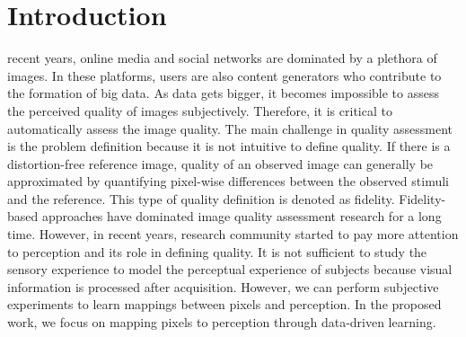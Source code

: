 \documentclass[draftcls,12pt, onecolumn]{IEEEtran}
\begin{document}
\IEEEpeerreviewmaketitle



\section{Introduction}
\label{sec:intro}
 recent years, online media and social networks are dominated by a plethora of images. In these platforms, users are also content generators who contribute to the formation of big data. As data gets bigger, it becomes impossible to assess the perceived quality of images subjectively. Therefore, it is critical to automatically assess the image quality. The main challenge in quality assessment is the problem definition because it is not intuitive to define quality. If there is a distortion-free reference image, quality of an observed image can generally be approximated by quantifying pixel-wise differences between the observed stimuli and the reference. This type of quality definition is denoted as fidelity. Fidelity-based approaches have dominated image quality assessment research for a long time. However, in recent years, research community started to pay more attention to perception and its role in defining quality. It is not sufficient to study the sensory experience to model the perceptual experience of subjects because visual information is processed after acquisition. However, we can perform subjective experiments to learn mappings between pixels and perception. In the proposed work, we focus on mapping pixels to perception through data-driven learning.
\end{document}
